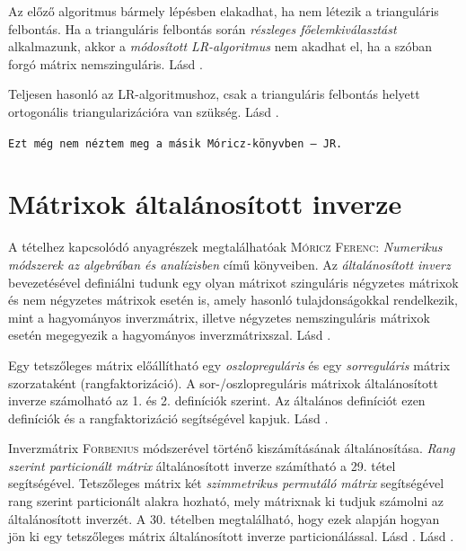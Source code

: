 \documentclass[DIV=15,appendixprefix]{scrreprt}
\theoremstyle{definition}
\theoremstyle{remark}
\begin{document}
Az előző algoritmus bármely lépésben elakadhat, ha nem létezik a trianguláris felbontás. Ha a
trianguláris felbontás során \emph{részleges főelemkiválasztást} alkalmazunk, akkor a
\emph{módosított LR-algoritmus} nem akadhat el, ha a szóban forgó mátrix nemszinguláris.
%
Lásd \cite[I. fejezet, 4. szakasz]{Moricz1997}.

Teljesen hasonló az LR-algoritmushoz, csak a trianguláris felbontás helyett ortogonális
triangularizációra van szükség.
%
Lásd \cite[II. fejezet, 5. szakasz]{Moricz2008}.

\texttt{Ezt még nem néztem meg a másik Móricz-könyvben -- JR.}
%
\section{Mátrixok általánosított inverze}
A tételhez kapcsolódó anyagrészek megtalálhatóak \textsc{Móricz Ferenc}: \emph{Numerikus módszerek
az algebrában és analízisben} \cite[II. fejezet]{Moricz1997} című könyveiben.
%
Az \emph{általánosított inverz} bevezetésével definiálni tudunk egy olyan mátrixot szinguláris
négyzetes mátrixok és nem négyzetes mátrixok esetén is, amely hasonló tulajdonságokkal rendelkezik,
mint a hagyományos inverzmátrix, illetve négyzetes nemszinguláris mátrixok esetén megegyezik a
hagyományos inverzmátrixszal.
%
Lásd \cite[II. fejezet, 6. szakasz]{Moricz1997}.

Egy tetszőleges mátrix előállítható egy \emph{oszlopreguláris} és egy \emph{sorreguláris} mátrix
szorzataként (rangfaktorizáció). A sor-/oszlopreguláris mátrixok általánosított inverze számolható
az 1. és 2. definíciók szerint. Az általános definíciót ezen definíciók és a rangfaktorizáció
segítségével kapjuk.
%
Lásd \cite[II. fejezet, 8. szakasz]{Moricz1997}.

Inverzmátrix \textsc{Forbenius} módszerével történő kiszámításának általánosítása. \emph{Rang
szerint particionált mátrix} általánosított inverze  számítható a 29. tétel
segítségével. Tetszőleges mátrix két \emph{szimmetrikus permutáló mátrix} segítségével rang szerint
particionált alakra hozható, mely mátrixnak ki tudjuk számolni az általánosított inverzét. A 30.
tételben megtalálható, hogy ezek alapján hogyan jön ki egy tetszőleges mátrix általánosított inverze
particionálással.
%
Lásd \cite[II. fejezet, 8. szakasz utolsó megjegyzése]{Moricz1997}.
%
Lásd \cite[II. fejezet, 7. szakasz]{Moricz1997}.
\end{document}
